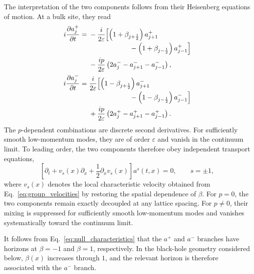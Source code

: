 \documentclass[reprint,amsmath,amssymb,aps,prb,showkeys,superscriptaddress]{revtex4-2}
\begin{document}
The interpretation of the two components follows from their
Heisenberg equations of motion. At a bulk site, they read
\begin{subequations}
\label{eq:a_eom_lattice}
\begin{align}
  i\frac{\partial a_j^+}{\partial t}
  ={}&
  -\frac{i}{2\varepsilon}
  \Bigl[
    \left(
      1+\beta_{j+\frac12}
    \right)a_{j+1}^+
  \nonumber\\[-2pt]
  &\hspace{21mm}
    -
    \left(
      1+\beta_{j-\frac12}
    \right)a_{j-1}^+
  \Bigr]
  \nonumber\\
  &-
  \frac{i p}{2\varepsilon}
  \left(
    2a_j^-
    -a_{j+1}^-
    -a_{j-1}^-
  \right),
  \label{eq:a_plus_eom}
  \\
  i\frac{\partial a_j^-}{\partial t}
  ={}&
  \frac{i}{2\varepsilon}
  \Bigl[
    \left(
      1-\beta_{j+\frac12}
    \right)a_{j+1}^-
  \nonumber\\[-2pt]
  &\hspace{21mm}
    -
    \left(
      1-\beta_{j-\frac12}
    \right)a_{j-1}^-
  \Bigr]
  \nonumber\\
  &+
  \frac{i p}{2\varepsilon}
  \left(
    2a_j^+
    -a_{j+1}^+
    -a_{j-1}^+
  \right).
  \label{eq:a_minus_eom}
\end{align}
\end{subequations}
The $p$-dependent combinations are discrete second derivatives.
For sufficiently smooth low-momentum modes, they are of order
$\varepsilon$ and vanish in the continuum limit. To leading order,
the two components therefore obey independent transport equations,
\begin{equation}
  \left[
    \partial_t
    +v_s(x)\partial_x
    +\frac{1}{2}\partial_xv_s(x)
  \right]
  a^s(t,x)
  =
  0,
  \qquad
  s=\pm1,
  \label{eq:continuum_transport}
\end{equation}
where $v_s(x)$ denotes the local characteristic velocity obtained
from Eq.~\eqref{eq:group_velocities} by restoring the spatial
dependence of $\beta$. For $p=0$, the two components remain exactly
decoupled at any lattice spacing. For $p\neq0$, their mixing is
suppressed for sufficiently smooth low-momentum modes and vanishes
systematically toward the continuum limit.

It follows from Eq.~\eqref{eq:null_characteristics} that the
$a^+$ and $a^-$ branches have horizons at $\beta=-1$ and
$\beta=1$, respectively. In the black-hole geometry considered
below, $\beta(x)$ increases through $1$, and the relevant horizon
is therefore associated with the $a^-$ branch.
\end{document}
